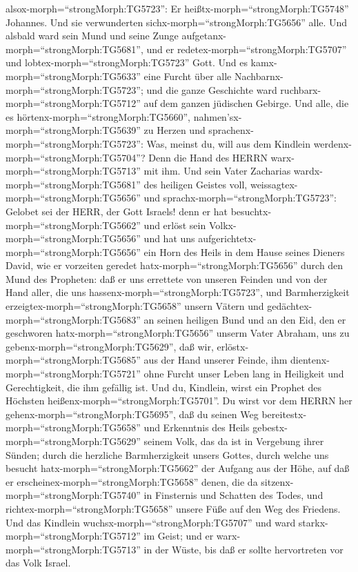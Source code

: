 alsox-morph=``strongMorph:TG5723'': Er
heißtx-morph=``strongMorph:TG5748'' Johannes. Und sie verwunderten
sichx-morph=``strongMorph:TG5656'' alle.  Und alsbald ward
sein Mund und seine Zunge aufgetanx-morph=``strongMorph:TG5681'', und er
redetex-morph=``strongMorph:TG5707'' und
lobtex-morph=``strongMorph:TG5723'' Gott.  Und es
kamx-morph=``strongMorph:TG5633'' eine Furcht über alle
Nachbarnx-morph=``strongMorph:TG5723''; und die ganze Geschichte ward
ruchbarx-morph=``strongMorph:TG5712'' auf dem ganzen jüdischen Gebirge.
 Und alle, die es hörtenx-morph=``strongMorph:TG5660'',
nahmen'sx-morph=``strongMorph:TG5639'' zu Herzen und
sprachenx-morph=``strongMorph:TG5723'': Was, meinst du, will aus dem
Kindlein werdenx-morph=``strongMorph:TG5704''? Denn die Hand des HERRN
warx-morph=``strongMorph:TG5713'' mit ihm.  Und sein Vater
Zacharias wardx-morph=``strongMorph:TG5681'' des heiligen Geistes voll,
weissagtex-morph=``strongMorph:TG5656'' und
sprachx-morph=``strongMorph:TG5723'':  Gelobet sei der
HERR, der Gott Israels! denn er hat
besuchtx-morph=``strongMorph:TG5662'' und erlöst sein
Volkx-morph=``strongMorph:TG5656''  und hat uns
aufgerichtetx-morph=``strongMorph:TG5656'' ein Horn des Heils in dem
Hause seines Dieners David,  wie er vorzeiten geredet
hatx-morph=``strongMorph:TG5656'' durch den Mund des Propheten:
 daß er uns errettete von unseren Feinden und von der Hand
aller, die uns hassenx-morph=``strongMorph:TG5723'',  und
Barmherzigkeit erzeigtex-morph=``strongMorph:TG5658'' unsern Vätern und
gedächtex-morph=``strongMorph:TG5683'' an seinen heiligen Bund
 und an den Eid, den er geschworen
hatx-morph=``strongMorph:TG5656'' unserm Vater Abraham, uns zu
gebenx-morph=``strongMorph:TG5629'',  daß wir,
erlöstx-morph=``strongMorph:TG5685'' aus der Hand unserer Feinde, ihm
dientenx-morph=``strongMorph:TG5721'' ohne Furcht unser Leben lang
 in Heiligkeit und Gerechtigkeit, die ihm gefällig ist.
 Und du, Kindlein, wirst ein Prophet des Höchsten
heißenx-morph=``strongMorph:TG5701''. Du wirst vor dem HERRN her
gehenx-morph=``strongMorph:TG5695'', daß du seinen Weg
bereitestx-morph=``strongMorph:TG5658''  und Erkenntnis des
Heils gebestx-morph=``strongMorph:TG5629'' seinem Volk, das da ist in
Vergebung ihrer Sünden;  durch die herzliche Barmherzigkeit
unsers Gottes, durch welche uns besucht
hatx-morph=``strongMorph:TG5662'' der Aufgang aus der Höhe,
 auf daß er erscheinex-morph=``strongMorph:TG5658'' denen,
die da sitzenx-morph=``strongMorph:TG5740'' in Finsternis und Schatten
des Todes, und richtex-morph=``strongMorph:TG5658'' unsere Füße auf den
Weg des Friedens.  Und das Kindlein
wuchsx-morph=``strongMorph:TG5707'' und ward
starkx-morph=``strongMorph:TG5712'' im Geist; und er
warx-morph=``strongMorph:TG5713'' in der Wüste, bis daß er sollte
hervortreten vor das Volk Israel.


